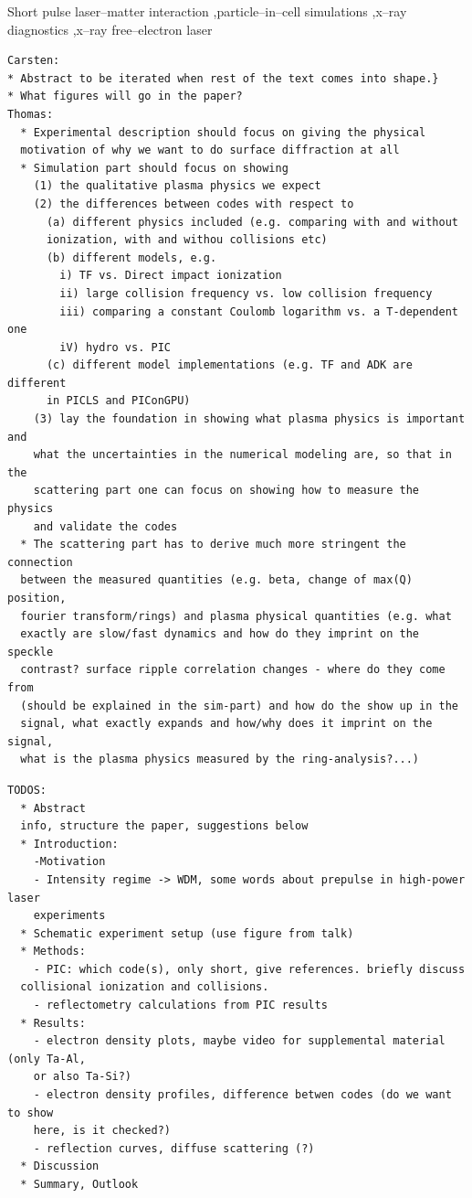 \documentclass[preprint, 12pt]{elsarticle}
\begin{document}
\begin{frontmatter}
\begin{keyword}
Short pulse laser--matter interaction \sep particle--in--cell simulations \sep x--ray
diagnostics \sep x--ray free--electron laser
\end{keyword}
\end{frontmatter}

\linenumbers
\begin{verbatim}
Carsten:
* Abstract to be iterated when rest of the text comes into shape.}
* What figures will go in the paper?
Thomas:
  * Experimental description should focus on giving the physical
  motivation of why we want to do surface diffraction at all
  * Simulation part should focus on showing
    (1) the qualitative plasma physics we expect
    (2) the differences between codes with respect to
      (a) different physics included (e.g. comparing with and without
      ionization, with and withou collisions etc)
      (b) different models, e.g.
        i) TF vs. Direct impact ionization
        ii) large collision frequency vs. low collision frequency
        iii) comparing a constant Coulomb logarithm vs. a T-dependent one
        iV) hydro vs. PIC
      (c) different model implementations (e.g. TF and ADK are different
      in PICLS and PIConGPU)
    (3) lay the foundation in showing what plasma physics is important and
    what the uncertainties in the numerical modeling are, so that in the
    scattering part one can focus on showing how to measure the physics
    and validate the codes
  * The scattering part has to derive much more stringent the connection
  between the measured quantities (e.g. beta, change of max(Q) position,
  fourier transform/rings) and plasma physical quantities (e.g. what
  exactly are slow/fast dynamics and how do they imprint on the speckle
  contrast? surface ripple correlation changes - where do they come from
  (should be explained in the sim-part) and how do the show up in the
  signal, what exactly expands and how/why does it imprint on the signal,
  what is the plasma physics measured by the ring-analysis?...)
\end{verbatim}
\begin{verbatim}
TODOS:
  * Abstract
  info, structure the paper, suggestions below
  * Introduction:
    -Motivation
    - Intensity regime -> WDM, some words about prepulse in high-power laser
    experiments
  * Schematic experiment setup (use figure from talk)
  * Methods:
    - PIC: which code(s), only short, give references. briefly discuss
  collisional ionization and collisions.
    - reflectometry calculations from PIC results
  * Results:
    - electron density plots, maybe video for supplemental material (only Ta-Al,
    or also Ta-Si?)
    - electron density profiles, difference betwen codes (do we want to show
    here, is it checked?)
    - reflection curves, diffuse scattering (?)
  * Discussion
  * Summary, Outlook
\end{verbatim}
\end{document}
